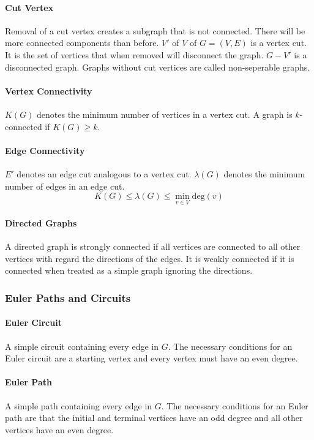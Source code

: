 \documentclass[a4paper, 10pt]{article}
\begin{document}
\paragraph{Cut Vertex}
Removal of a cut vertex creates a subgraph that is not connected. There will be more connected components than before. \(V'\) of \(V\) of \(G=(V,E)\) is a vertex cut. It is the set of vertices that when removed will disconnect the graph. \(G-V'\) is a disconnected graph. Graphs without cut vertices are called non-seperable graphs.
\paragraph{Vertex Connectivity}
\(K(G)\) denotes the minimum number of vertices in a vertex cut. A graph is \(k\)-connected if \(K(G)\geq k\).
\paragraph{Edge Connectivity}
\(E'\) denotes an edge cut analogous to a vertex cut. \(\lambda(G)\) denotes the minimum number of edges in an edge cut.
\[ K(G)\leq \lambda(G)\leq \min_{v\in V}\mathrm{deg}(v) \]
\paragraph{Directed Graphs}
A directed graph is strongly connected if all vertices are connected to all other vertices with regard the directions of the edges. It is weakly connected if it is connected when treated as a simple graph ignoring the directions.

\subsubsection{Euler Paths and Circuits}
\paragraph{Euler Circuit}
A simple circuit containing every edge in \(G\). The necessary conditions for an Euler circuit are a starting vertex and every vertex must have an even degree.
\paragraph{Euler Path}
A simple path containing every edge in \(G\). The necessary conditions for an Euler path are that the initial and terminal vertices have an odd degree and all other vertices have an even degree.
\end{document}
